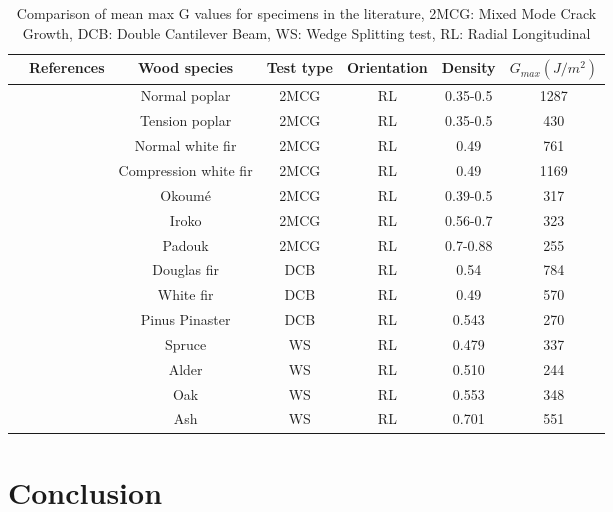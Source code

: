 \begin{table} \centering
	\begin{tabular}{ccccccc}
		\toprule %
		& References & Wood species & Test type & Orientation & Density & $G_{max}(J/m^2)$\\\midrule
		& \cite{Mambili2018} & Normal poplar & 2MCG & RL & 0.35-0.5 & 1287\\\midrule
		& \cite{Mambili2018} & Tension poplar & 2MCG & RL & 0.35-0.5 & 430\\\midrule
		& \cite{Mambili2018} & Normal white fir & 2MCG & RL & 0.49 & 761\\\midrule
		& \cite{Mambili2018} & Compression white fir & 2MCG & RL  & 0.49 & 1169\\\midrule
		& \cite{Odounga2018phd} & Okoumé & 2MCG & RL & 0.39-0.5 & 317\\\midrule
		& \cite{Odounga2018phd} & Iroko & 2MCG & RL & 0.56-0.7 & 323\\\midrule
		& \cite{Odounga2018phd} & Padouk & 2MCG & RL & 0.7-0.88 & 255\\\midrule
		& \cite{Angellier2017} & Douglas fir & DCB & RL  & 0.54 & 784\\\midrule
		& \cite{Angellier2017} & White fir & DCB & RL  & 0.49 & 570\\\midrule
		& \cite{Xavieretal2014} & Pinus Pinaster & DCB & RL & 0.543 & 270\\\midrule
		& \cite{Reiterer2002} & Spruce & WS & RL & 0.479 & 337\\\midrule
		& \cite{Reiterer2002} & Alder & WS & RL & 0.510 & 244\\\midrule
		& \cite{Reiterer2002} & Oak & WS & RL & 0.553 & 348\\\midrule
		& \cite{Reiterer2002} & Ash & WS & RL & 0.701 & 551\\\midrule
		\bottomrule %
	\end{tabular}
	\caption{Comparison of mean max G values for specimens in the literature, 2MCG: Mixed Mode Crack Growth, DCB: Double Cantilever Beam, WS: Wedge Splitting test, RL: Radial Longitudinal}
	\label{fig:fig37}
\end{table}

\section{Conclusion}